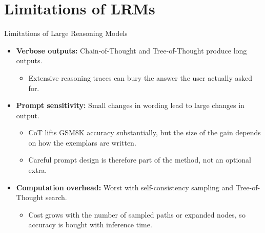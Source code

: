 \section{Limitations of LRMs}
\begin{frame}{Limitations of Large Reasoning Models}
    \begin{itemize}
        \item \textbf{Verbose outputs:} Chain-of-Thought and Tree-of-Thought produce long outputs.
        \begin{itemize}
            \item Extensive reasoning traces can bury the answer the user actually asked for.
        \end{itemize}
        \item \textbf{Prompt sensitivity:} Small changes in wording lead to large changes in output.
        \begin{itemize}
            \item CoT lifts GSM8K accuracy substantially, but the size of the gain depends on how the exemplars are written.
            \item Careful prompt design is therefore part of the method, not an optional extra.
        \end{itemize}
        \item \textbf{Computation overhead:} Worst with self-consistency sampling and Tree-of-Thought search.
        \begin{itemize}
            \item Cost grows with the number of sampled paths or expanded nodes, so accuracy is bought with inference time.
        \end{itemize}
    \end{itemize}
\end{frame}

